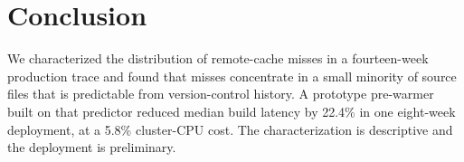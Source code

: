 \documentclass{anvil-paper}
\begin{document}
\section{Conclusion}
\label{sec:conclusion}

We characterized the distribution of remote-cache misses in a fourteen-week
production trace and found that misses concentrate in a small minority of
source files that is predictable from version-control history. A prototype
pre-warmer built on that predictor reduced median build latency by 22.4\% in
one eight-week deployment, at a 5.8\% cluster-CPU cost. The characterization
is descriptive and the deployment is preliminary.



\end{document}
